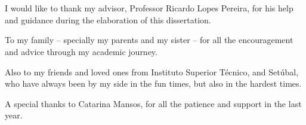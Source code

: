 \chapter*{\acknowledgments}


I would like to thank my advisor, Professor Ricardo Lopes Pereira, for his help and guidance during the elaboration of this dissertation.

To my family – specially my parents and my sister – for all the encouragement and advice through my academic journey.

Also to my friends and loved ones from Instituto Superior Técnico, and Setúbal, who have always been by my side in the fun times, but also in the hardest times.

A special thanks to Catarina Mansos, for all the patience and support in the last year.


\cleardoublepage

